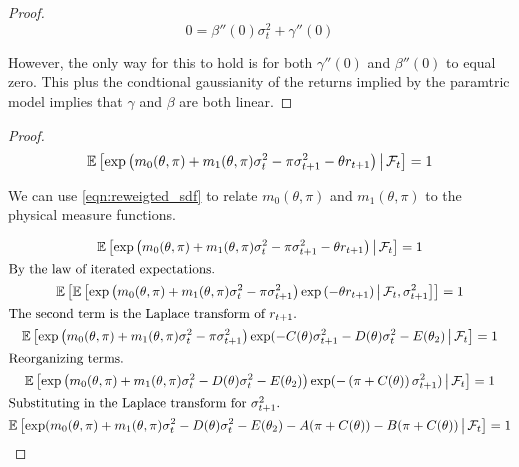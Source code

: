 \documentclass[11pt, letterpaper, twoside, final]{article}
\begin{document}
\begin{appendices}
\begin{proof}
 \begin{equation}
  0 = \beta''(0) \sigma^2_t + \gamma''(0)
 \end{equation}

 However, the only way for this to hold is for both $\gamma''(0)$ and $\beta''(0)$ to equal zero.
 This plus the condtional gaussianity of the returns implied by the paramtric model implies that $\gamma$
 and $\beta$ are both linear.

\end{proof}


\sdfConstants*

\begin{proof}

\begin{equation}
 \label{eqn:reweigted_sdf}
 \operatorname{\mathbb{E}}\left[\exp\left(m_0(\theta, \pi) + m_1(\theta, \pi) \sigma^2_t - \pi \sigma^2_{t+1} - \theta r_{t+1}
 \right) \,\middle\vert\, \mathcal{F}_t \right] = 1 
\end{equation}

We can use \cref{eqn:reweigted_sdf} to relate $m_0(\theta, \pi)$ and $m_1(\theta, \pi)$ to the physical measure
functions. 

\begin{gather}
 \E\left[\exp\left(m_0(\theta, \pi) + m_1(\theta, \pi) \sigma^2_t - \pi \sigma^2_{t+1} - \theta r_{t+1}
 \right) \mvert \F_t \right] = 1 \\
%
 \intertext{By the law of iterated expectations.}
%
 \E\left[ \E\left[\exp\left(m_0(\theta, \pi) + m_1(\theta, \pi) \sigma^2_t - \pi \sigma^2_{t+1}\right)
  \exp\left( - \theta r_{t+1}\right) \mvert \F_t, \sigma^2_{t+1} \right]\right] = 1 \\
%
 \intertext{The second term is the Laplace transform of $r_{t+1}$.}
%
 \E\left[\exp\left(m_0(\theta, \pi) + m_1(\theta, \pi) \sigma^2_t - \pi \sigma^2_{t+1} \right)
  \exp(-C(\theta) \sigma^2_{t+1} - D(\theta) \sigma^2_{t} - E(\theta_2) \mvert \F_t \right] = 1 \\
%
 \intertext{Reorganizing terms.}
%
 \E\left[\exp\left(m_0(\theta, \pi) + m_1(\theta, \pi) \sigma^2_t - D(\theta) \sigma^2_{t} - E(\theta_2)
 \right) \exp(-\left(\pi + C(\theta)\right) \sigma^2_{t+1}) \mvert \F_t \right] = 1 \\ 
%
 \intertext{Substituting in the Laplace transform for $\sigma^2_{t+1}$.} 
%
 \label{eqn:expected_sdf_wrt_PP}
 \E\left[\exp(m_0(\theta, \pi) + m_1(\theta, \pi) \sigma^2_t - D(\theta) \sigma^2_{t} - E(\theta_2) - A(\pi +
 C(\theta)) - B(\pi + C(\theta)) \mvert \F_t \right] = 1 
\end{gather}


\end{proof}
\end{appendices}
\end{document}
